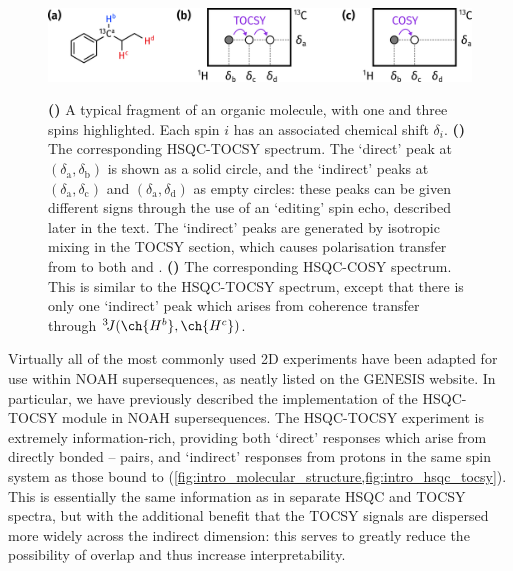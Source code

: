 \documentclass[a4paper,12pt]{article}
\newcommand{\proton}{\ch{^{1}H}}
\newcommand{\carbon}{\ch{^{13}C}}
\newcommand{\CH}{\carbon{}--\proton{}}
\begin{document}
\begin{refsection}
\begin{figure}[!ht]
    \centering
    \includegraphics[]{intro.png}%
    {\label{fig:intro_molecular_structure}}%
    {\label{fig:intro_hsqc_tocsy}}%
    {\label{fig:intro_hsqc_cosy}}%
    \caption[Mockup illustrating salient features of HSQC-TOCSY and -COSY spectra]{
        \textbf{()} A typical fragment of an organic molecule, with one \carbon{} and three \proton{} spins highlighted.
        Each spin $i$ has an associated chemical shift $\delta_i$.
        \textbf{()} The corresponding HSQC-TOCSY spectrum.
        The `direct' peak at $(\delta_{\mathrm{a}}, \delta_{\mathrm{b}})$ is shown as a solid circle, and the `indirect' peaks at $(\delta_{\mathrm{a}}, \delta_{\mathrm{c}})$ and $(\delta_{\mathrm{a}}, \delta_{\mathrm{d}})$ as empty circles: these peaks can be given different signs through the use of an `editing' spin echo, described later in the text.
        The `indirect' peaks are generated by isotropic mixing in the TOCSY section, which causes polarisation transfer from  to both  and .
        \textbf{()} The corresponding HSQC-COSY spectrum.
        This is similar to the HSQC-TOCSY spectrum, except that there is only one `indirect' peak which arises from coherence transfer through ${}^3\!J(\ch{H^b},\ch{H^c})$.
    }
    \label{fig:intro}
\end{figure}

Virtually all of the most commonly used 2D experiments have been adapted for use within NOAH supersequences, as neatly listed on the GENESIS website\autocite{Yong2022AC}.
In particular, we have previously described the implementation of the HSQC-TOCSY module in NOAH supersequences.\autocite{Yong2021JMR}
The HSQC-TOCSY experiment is extremely information-rich, providing both `direct' responses which arise from directly bonded \CH{} pairs, and `indirect' responses from protons in the same spin system as those bound to \carbon{} (\cref{fig:intro_molecular_structure,fig:intro_hsqc_tocsy}).
This is essentially the same information as in separate HSQC and TOCSY spectra, but with the additional benefit that the TOCSY signals are dispersed more widely across the \carbon{} indirect dimension: this serves to greatly reduce the possibility of overlap and thus increase interpretability.


\end{refsection}
\end{document}
